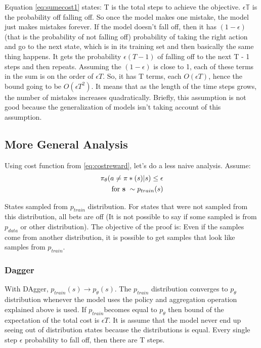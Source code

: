 \documentclass[]{article}
\begin{document}
\par Equation \eqref{eq:sumecost1} states: T is the total steps to achieve the objective. $\epsilon \mathbb{T}$$ $ is
the probability off falling off. So once the model makes one mistake, the model just makes mistakes forever. If the model
doesn't fall off, then it has $(1 - \epsilon)$ (that is the probability of not falling off) probability of taking the
right action and go to the next state, which is in its training set and then basically the same thing happens. It
gets the probability $\epsilon (T - 1)$ of falling off to the next T - 1 steps and then repeats. Assuming the $(1 -
\epsilon) $ is close to 1, each of these terms in the sum is on the order of $\epsilon T$. So, it has T terms,
each $O(\epsilon T)$, hence the bound going to be $O(\epsilon T^{2})$. It means that as the length of the time steps
grows, the number of mistakes increases quadratically. Briefly, this assumption is not good because the generalization of
models isn't taking account of this assumption. 


\subsection*{More General Analysis}%
\label{sub:More General Analysis}

\par Using cost function from \eqref{eq:costreward}, let's do a less naive analysis. Assume:
\begin{equation}
    \label{eq:cost2}
    \begin{split}
    \pi_{\theta}(a \neq \pi*(s)|s) \leq \epsilon \\ 
    \text{for \textbf{s} } \sim p_{train}(s)
    \end{split}
\end{equation}
\par States sampled from $p_{train}$ distribution.  For states that were not sampled from this distribution, all bets
are off (It is not possible to say if some sampled is from $p_{data}$ or other distribution). The objective of the
proof is: Even if the samples come from another distribution, it is possible to get samples that look like samples from
$p_{train}$. 

\subsubsection*{Dagger}
With DAgger, $p_{train}(s) \rightarrow p_{\theta}(s)$. The $p_{train} $ distribution converges  to $p_{\theta} $ distribution
whenever the model uses the policy and aggregation operation explained above is used. If $p_{train}  $becomes equal to
$p_{\theta}$  then bound of the expectation of the total cost is  $\epsilon T$. It is assume that the model never end up seeing out of
distribution states because the distributions is equal. Every single step $\epsilon $  probability  to fall off, then
there are T steps.
\end{document}
